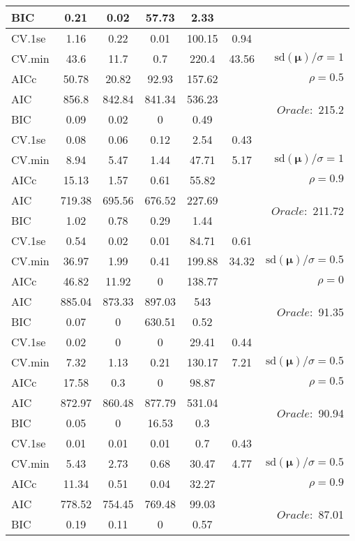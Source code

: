 \begin{table}
\begin{center}
\begin{tabular}{l*{5}{c}|r}
BIC & 0.21 & 0.02 & 57.73 & 2.33 & &  \\
 \hline 
CV.1se & 1.16 & 0.22 & 0.01 & 100.15 & 0.94 & \\
CV.min & 43.6 & 11.7 & 0.7 & 220.4 & 43.56 &  $\mathrm{sd}(\mathbf{\mu})/\sigma=1$ \\
AICc & 50.78 & 20.82 & 92.93 & 157.62 & & $\rho=0.5$ \\
AIC & 856.8 & 842.84 & 841.34 & 536.23 & &  \multirow{2}{*}{$Oracle: $ 215.2} \\
BIC & 0.09 & 0.02 & 0 & 0.49 & &  \\
 \hline 
CV.1se & 0.08 & 0.06 & 0.12 & 2.54 & 0.43 & \\
CV.min & 8.94 & 5.47 & 1.44 & 47.71 & 5.17 &  $\mathrm{sd}(\mathbf{\mu})/\sigma=1$ \\
AICc & 15.13 & 1.57 & 0.61 & 55.82 & & $\rho=0.9$ \\
AIC & 719.38 & 695.56 & 676.52 & 227.69 & &  \multirow{2}{*}{$Oracle: $ 211.72} \\
BIC & 1.02 & 0.78 & 0.29 & 1.44 & &  \\
 \hline 
CV.1se & 0.54 & 0.02 & 0.01 & 84.71 & 0.61 & \\
CV.min & 36.97 & 1.99 & 0.41 & 199.88 & 34.32 &  $\mathrm{sd}(\mathbf{\mu})/\sigma=0.5$ \\
AICc & 46.82 & 11.92 & 0 & 138.77 & & $\rho=0$ \\
AIC & 885.04 & 873.33 & 897.03 & 543 & &  \multirow{2}{*}{$Oracle: $ 91.35} \\
BIC & 0.07 & 0 & 630.51 & 0.52 & &  \\
 \hline 
CV.1se & 0.02 & 0 & 0 & 29.41 & 0.44 & \\
CV.min & 7.32 & 1.13 & 0.21 & 130.17 & 7.21 &  $\mathrm{sd}(\mathbf{\mu})/\sigma=0.5$ \\
AICc & 17.58 & 0.3 & 0 & 98.87 & & $\rho=0.5$ \\
AIC & 872.97 & 860.48 & 877.79 & 531.04 & &  \multirow{2}{*}{$Oracle: $ 90.94} \\
BIC & 0.05 & 0 & 16.53 & 0.3 & &  \\
 \hline 
CV.1se & 0.01 & 0.01 & 0.01 & 0.7 & 0.43 & \\
CV.min & 5.43 & 2.73 & 0.68 & 30.47 & 4.77 &  $\mathrm{sd}(\mathbf{\mu})/\sigma=0.5$ \\
AICc & 11.34 & 0.51 & 0.04 & 32.27 & & $\rho=0.9$ \\
AIC & 778.52 & 754.45 & 769.48 & 99.03 & &  \multirow{2}{*}{$Oracle: $ 87.01} \\
BIC & 0.19 & 0.11 & 0 & 0.57 & &  \\
 \hline 
\end{tabular}
\end{center}
\vspace{-1cm}
\end{table}





